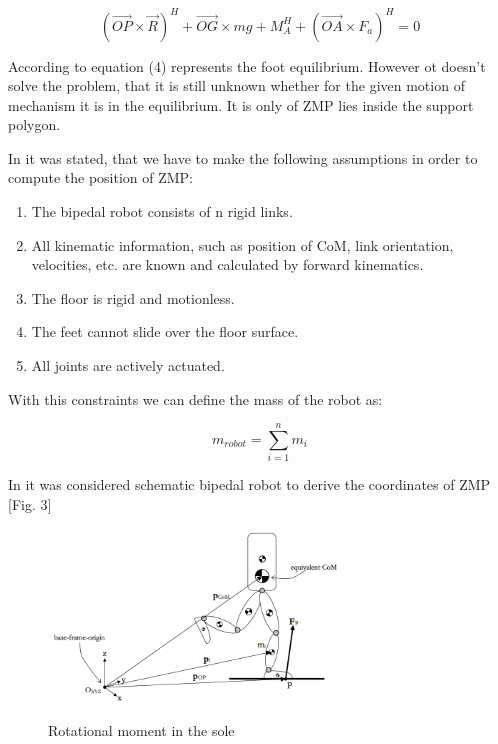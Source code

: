 \documentclass[11pt,a4paper]{report}
\begin{document}
	\begin{equation}
		(\vec{OP} \times \vec{R})^H + \vec{OG} \times mg + M_A^H + (\vec{OA} \times F_a)^H = 0
	\end{equation}

According to \cite{vukobratovic2004zero} equation (4) represents the foot equilibrium. However ot doesn't solve the problem, that it is still unknown whether for the given motion of mechanism it is in the equilibrium. It is only of ZMP lies inside the support polygon.

In \cite{dekker2009zero} it was stated, that we have to make the following assumptions in order to compute the position of ZMP:

	\begin{enumerate}
		\item
			The bipedal robot consists of n rigid links.
		\item
			All kinematic information, such as position of CoM, link orientation, velocities, etc. are known and calculated by forward kinematics.
		\item
			The floor is rigid and motionless.
		\item
			The feet cannot slide over the floor surface.
		\item
			All joints are actively actuated.
	\end{enumerate}
	
With this constraints we can define the mass of the robot as:
	
	\begin{equation}
		m_{robot} = \sum^n_{i=1}{m_i}
	\end{equation}

In \cite{dekker2009zero} it was considered schematic bipedal robot to derive the coordinates of ZMP [Fig. 3]

	\begin{figure}[h!]
		\vspace{-0.2cm}
		\centering
		{\includegraphics[width=0.7\textwidth]{3}}
		\caption{Rotational moment in the sole \cite{dekker2009zero}}
		\label{fig:3}
		\vspace{-0.1cm}
	\end{figure}
\end{document}
